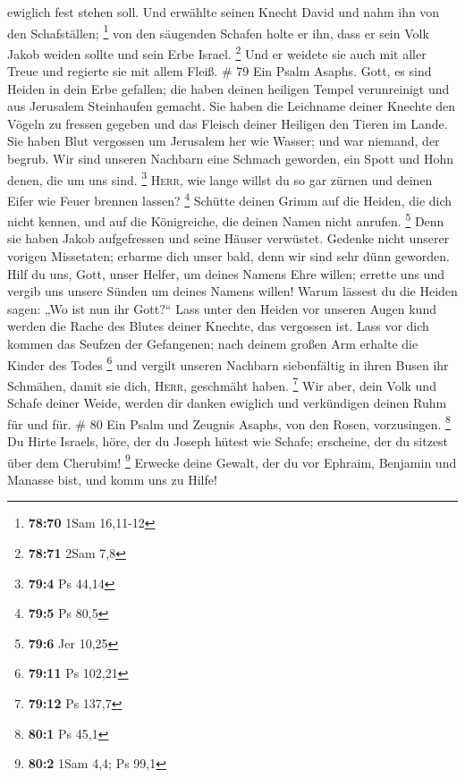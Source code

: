 ewiglich fest stehen soll.  Und erwählte seinen Knecht
David und nahm ihn von den Schafställen; \footnote{\textbf{78:70} 1Sam
  16,11-12}  von den säugenden Schafen holte er ihn, dass
er sein Volk Jakob weiden sollte und sein Erbe Israel. \footnote{\textbf{78:71}
  2Sam 7,8}  Und er weidete sie auch mit aller Treue und
regierte sie mit allem Fleiß. \# 79  Ein Psalm Asaphs.
Gott, es sind Heiden in dein Erbe gefallen; die haben deinen heiligen
Tempel verunreinigt und aus Jerusalem Steinhaufen gemacht.
 Sie haben die Leichname deiner Knechte den Vögeln zu
fressen gegeben und das Fleisch deiner Heiligen den Tieren im Lande.
 Sie haben Blut vergossen um Jerusalem her wie Wasser; und
war niemand, der begrub.  Wir sind unseren Nachbarn eine
Schmach geworden, ein Spott und Hohn denen, die um uns sind. \footnote{\textbf{79:4}
  Ps 44,14}  \textsc{Herr}, wie lange willst du so gar
zürnen und deinen Eifer wie Feuer brennen lassen? \footnote{\textbf{79:5}
  Ps 80,5}  Schütte deinen Grimm auf die Heiden, die dich
nicht kennen, und auf die Königreiche, die deinen Namen nicht anrufen.
\footnote{\textbf{79:6} Jer 10,25}  Denn sie haben Jakob
aufgefressen und seine Häuser verwüstet.  Gedenke nicht
unserer vorigen Missetaten; erbarme dich unser bald, denn wir sind sehr
dünn geworden.  Hilf du uns, Gott, unser Helfer, um deines
Namens Ehre willen; errette uns und vergib uns unsere Sünden um deines
Namens willen!  Warum lässest du die Heiden sagen: „Wo
ist nun ihr Gott?{}`` Lass unter den Heiden vor unseren Augen kund
werden die Rache des Blutes deiner Knechte, das vergossen ist.
 Lass vor dich kommen das Seufzen der Gefangenen; nach
deinem großen Arm erhalte die Kinder des Todes \footnote{\textbf{79:11}
  Ps 102,21}  und vergilt unseren Nachbarn siebenfältig
in ihren Busen ihr Schmähen, damit sie dich, \textsc{Herr}, geschmäht
haben. \footnote{\textbf{79:12} Ps 137,7}  Wir aber, dein
Volk und Schafe deiner Weide, werden dir danken ewiglich und verkündigen
deinen Ruhm für und für. \# 80  Ein Psalm und Zeugnis
Asaphs, von den Rosen, vorzusingen. \footnote{\textbf{80:1} Ps 45,1}
 Du Hirte Israels, höre, der du Joseph hütest wie Schafe;
erscheine, der du sitzest über dem Cherubim! \footnote{\textbf{80:2}
  1Sam 4,4; Ps 99,1}  Erwecke deine Gewalt, der du vor
Ephraim, Benjamin und Manasse bist, und komm uns zu Hilfe!
